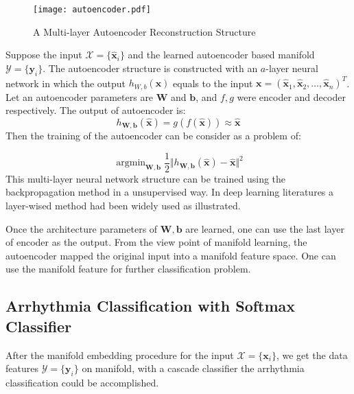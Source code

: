 \documentclass[journal]{IEEEtran}
\DeclareMathOperator*{\argmin}{argmin}
\begin{document}
\begin{figure}[!t]
\centering
\label{figauto}
\texttt{[image: autoencoder.pdf]}
\caption{A Multi-layer Autoencoder Reconstruction Structure}
\label{fig_sim}
\end{figure}

Suppose the input $\mathcal{X} = \{\bm{\hat{x}}_i\}$ and the learned autoencoder based manifold $\mathcal{Y} = \{\bm{y}_i\}$. The autoencoder structure is constructed with an $a$-layer neural network in which the output $h_{W, b}(\bm{x}) $ equals to the input $\bm{x} = (\bm{\hat{x}}_1, \bm{\hat{x}}_2, \ldots, \bm{\hat{x}}_n)^T$. Let an autoencoder parameters are $\bm{W}$ and $\bm{b}$, and $f, g$ were encoder and decoder respectively. 
The output of autoencoder is:
\begin{equation}
h_{\bm{W}, \bm{b}}(\bm{\hat{x}}) = g(f(\bm{\hat{x}})) \approx \bm{\hat{x}}
\end{equation}
Then the training of the autoencoder can be consider as a problem of:

\begin{equation}
\argmin_{\bm{W}, \bm{b}} \frac{1}{2} \Vert h_{\bm{W}, \bm{b}}(\bm{\hat{x}}) - \bm{\hat{x}} \Vert^2
\end{equation}
This multi-layer neural network structure can be trained using the backpropagation method in a unsupervised way. In deep learning literatures a layer-wised method had been widely used as \cite{Bengio2009deeplearning} illustrated.

Once the architecture parameters of $\bm{W}, \bm{b}$ are learned, one can use the last layer of encoder as the output. From the view point of manifold learning, the autoencoder mapped the original input into a manifold feature space. One can use the manifold feature for further classification problem.

%
%

\subsection{Arrhythmia Classification with Softmax Classifier}
After the manifold embedding procedure for the input $\mathcal{X} = \{\bm{x}_i\}$, we get the data features  $\mathcal{Y} = \{\bm{y}_i\}$ on manifold, with a cascade classifier the arrhythmia classification could be accomplished.
\end{document}
